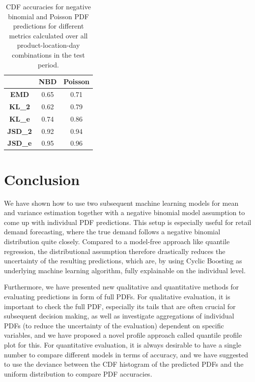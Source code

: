 \documentclass[BCOR=1mm, DIV=calc,10pt,
twoside=true,
twocolumn,
headings=normal]{scrartcl}
\begin{document}
\begin{table}[h!]
\begin{center}
\caption{CDF accuracies for negative binomial and Poisson PDF predictions for different metrics calculated over all product-location-day combinations in the test period.}
\label{tab:cdf:acc}
\begin{tabular}{c|c|c}
 & \textbf{NBD} & \textbf{Poisson} \\
\hline
\textbf{EMD} & 0.65 & 0.71 \\
\textbf{KL\_2} & 0.62 & 0.79 \\
\textbf{KL\_e} & 0.74 & 0.86 \\
\textbf{JSD\_2} & 0.92 & 0.94 \\
\textbf{JSD\_e} & 0.95 & 0.96
\end{tabular}
\end{center}
\end{table}


\section{Conclusion}

We have shown how to use two subsequent machine learning models for mean and variance estimation together with a negative binomial model assumption to come up with individual PDF predictions. This setup is especially useful for retail demand forecasting, where the true demand follows a negative binomial distribution quite closely. Compared to a model-free approach like quantile regression, the distributional assumption therefore drastically reduces the uncertainty of the resulting predictions, which are, by using Cyclic Boosting as underlying machine learning algorithm, fully explainable on the individual level.

Furthermore, we have presented new qualitative and quantitative methods for evaluating predictions in form of full PDFs. For qualitative evaluation, it is important to check the full PDF, especially its tails that are often crucial for subsequent decision making, as well as investigate aggregations of individual PDFs (to reduce the uncertainty of the evaluation) dependent on specific variables, and we have proposed a novel profile approach called quantile profile plot for this. For quantitative evaluation, it is always desirable to have a single number to compare different models in terms of accuracy, and we have suggested to use the deviance between the CDF histogram of the predicted PDFs and the uniform distribution to compare PDF accuracies.
\end{document}
